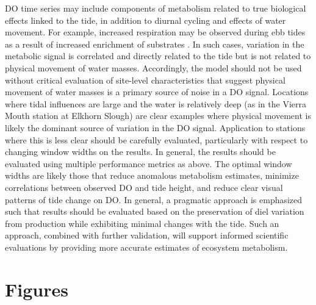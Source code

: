 \documentclass[letterpaper,12pt,oneside]{article}\usepackage[]{graphicx}\usepackage[]{color}
\begin{document}
\ac{DO} time series may include components of metabolism related to true biological effects linked to the tide, in addition to diurnal cycling and effects of water movement.  For example, increased respiration may be observed during ebb tides as a result of increased enrichment of substrates \citep{Sasaki09}.  In such cases, variation in the metabolic signal is correlated and directly related to the tide but is not related to physical movement of water masses. Accordingly, the model should not be used without critical evaluation of site-level characteristics that suggest physical movement of water masses is a primary source of noise in a \ac{DO} signal. Locations where tidal influences are large and the water is relatively deep (as in the Vierra Mouth station at Elkhorn Slough) are clear examples where physical movement is likely the dominant source of variation in the \ac{DO} signal.  Application to stations where this is less clear should be carefully evaluated, particularly with respect to changing window widths on the results.  In general, the results should be evaluated using multiple performance metrics as above. The optimal window widths are likely those that reduce anomalous metabolism estimates, minimize correlations between observed \ac{DO} and tide height, and reduce clear visual patterns of tide change on \ac{DO}.  In general, a pragmatic approach is emphasized such that results should be evaluated based on the preservation of diel variation from production while exhibiting minimal changes with the tide.  Such an approach, combined with further validation, will support informed scientific evaluations by providing more accurate estimates of ecosystem metabolism.  

\clearpage
\begin{singlespace}


\end{singlespace}
\clearpage


\section{Figures}
\end{document}

